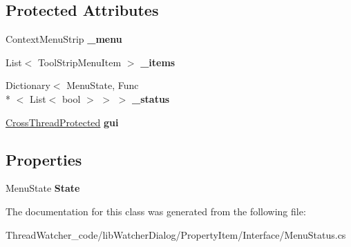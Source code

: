 \subsection*{Protected Attributes}
\begin{DoxyCompactItemize}
\item 
\hypertarget{classlib_watcher_dialog_1_1_property_item_1_1_menu_status_a8fe3b22bff864b58cefdca2ab0495866}{Context\+Menu\+Strip {\bfseries \+\_\+menu}}\label{classlib_watcher_dialog_1_1_property_item_1_1_menu_status_a8fe3b22bff864b58cefdca2ab0495866}

\item 
\hypertarget{classlib_watcher_dialog_1_1_property_item_1_1_menu_status_a32718c43d55b494578ad1b32aa94c60e}{List$<$ Tool\+Strip\+Menu\+Item $>$ {\bfseries \+\_\+items}}\label{classlib_watcher_dialog_1_1_property_item_1_1_menu_status_a32718c43d55b494578ad1b32aa94c60e}

\item 
\hypertarget{classlib_watcher_dialog_1_1_property_item_1_1_menu_status_ab4c4258346796e905afa487920bd4039}{Dictionary$<$ Menu\+State, Func\\*
$<$ List$<$ bool $>$ $>$ $>$ {\bfseries \+\_\+status}}\label{classlib_watcher_dialog_1_1_property_item_1_1_menu_status_ab4c4258346796e905afa487920bd4039}

\item 
\hypertarget{classlib_watcher_dialog_1_1_property_item_1_1_menu_status_ad7d2c1a82d814667654bcad190dfaddd}{\hyperlink{class_dialog_1_1_cross_thread_protected}{Cross\+Thread\+Protected} {\bfseries gui}}\label{classlib_watcher_dialog_1_1_property_item_1_1_menu_status_ad7d2c1a82d814667654bcad190dfaddd}

\end{DoxyCompactItemize}
\subsection*{Properties}
\begin{DoxyCompactItemize}
\item 
\hypertarget{classlib_watcher_dialog_1_1_property_item_1_1_menu_status_a5f97cccc5fa3e05ee1d4670ad4d2b0af}{Menu\+State {\bfseries State}}\label{classlib_watcher_dialog_1_1_property_item_1_1_menu_status_a5f97cccc5fa3e05ee1d4670ad4d2b0af}

\end{DoxyCompactItemize}


The documentation for this class was generated from the following file\+:\begin{DoxyCompactItemize}
\item 
Thread\+Watcher\+\_\+code/lib\+Watcher\+Dialog/\+Property\+Item/\+Interface/Menu\+Status.\+cs\end{DoxyCompactItemize}
